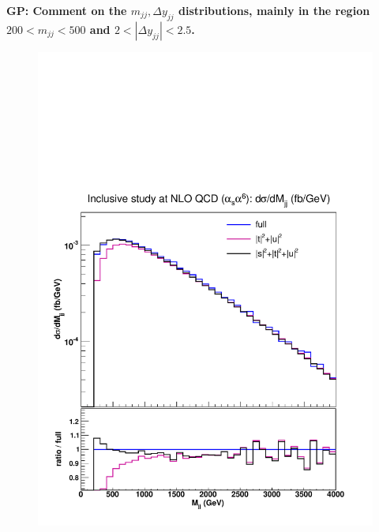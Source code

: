 {\bf GP: Comment on the $m_{jj}, \Delta y_{jj}$ distributions, mainly in the region $200 < m_{jj} < 500$ and $2<|\Delta y_{jj}|<2.5$.}
\begin{figure}[hbt]
\centering
{\includegraphics[scale=0.35]{figures/scanfigures/mjj_nlo.pdf}}

\end{figure}
